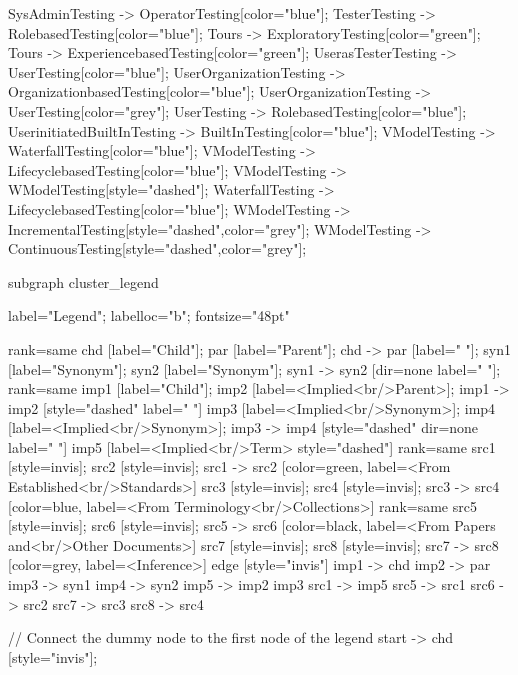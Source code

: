 \documentclass{article}
\begin{document}
{SysAdminTesting -> OperatorTesting[color="blue"];
TesterTesting -> RolebasedTesting[color="blue"];
Tours -> ExploratoryTesting[color="green"];
Tours -> ExperiencebasedTesting[color="green"];
UserasTesterTesting -> UserTesting[color="blue"];
UserOrganizationTesting -> OrganizationbasedTesting[color="blue"];
UserOrganizationTesting -> UserTesting[color="grey"];
UserTesting -> RolebasedTesting[color="blue"];
UserinitiatedBuiltInTesting -> BuiltInTesting[color="blue"];
VModelTesting -> WaterfallTesting[color="blue"];
VModelTesting -> LifecyclebasedTesting[color="blue"];
VModelTesting -> WModelTesting[style="dashed"];
WaterfallTesting -> LifecyclebasedTesting[color="blue"];
WModelTesting -> IncrementalTesting[style="dashed",color="grey"];
WModelTesting -> ContinuousTesting[style="dashed",color="grey"];

subgraph cluster_legend {

    label="Legend";
    labelloc="b";
    fontsize="48pt"

    {
        rank=same
        chd [label="Child"];
        par [label="Parent"];
        chd -> par [label="                "];
        syn1 [label="Synonym"];
        syn2 [label="Synonym"];
        syn1 -> syn2 [dir=none label="                "];
    }
    {
        rank=same
        imp1 [label="Child"];
        imp2 [label=<Implied<br/>Parent>];
        imp1 -> imp2 [style="dashed" label="                "]
        imp3 [label=<Implied<br/>Synonym>];
        imp4 [label=<Implied<br/>Synonym>];
        imp3 -> imp4 [style="dashed" dir=none label="                "]
    }
        imp5 [label=<Implied<br/>Term> style="dashed"]
{
rank=same
src1 [style=invis];
src2 [style=invis];
src1 -> src2 [color=green, label=<From Established<br/>Standards>]
src3 [style=invis];
src4 [style=invis];
src3 -> src4 [color=blue, label=<From Terminology<br/>Collections>]
}
{
rank=same
src5 [style=invis];
src6 [style=invis];
src5 -> src6 [color=black, label=<From Papers and<br/>Other Documents>]
src7 [style=invis];
src8 [style=invis];
src7 -> src8 [color=grey, label=<Inference>]
}
edge [style="invis"]
imp1 -> chd
imp2 -> par
imp3 -> syn1
imp4 -> syn2
imp5 -> { imp2 imp3 }
src1 -> imp5
src5 -> src1
src6 -> src2
src7 -> src3
src8 -> src4
}

// Connect the dummy node to the first node of the legend
start -> chd [style="invis"];
}
\end{document}
